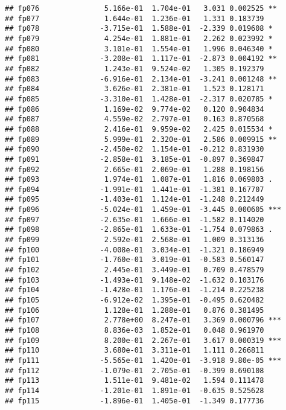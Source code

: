 \documentclass[
]{article}
\begin{document}
\begin{verbatim}
## fp076               5.166e-01  1.704e-01   3.031 0.002525 ** 
## fp077               1.644e-01  1.236e-01   1.331 0.183739    
## fp078              -3.715e-01  1.588e-01  -2.339 0.019608 *  
## fp079               4.254e-01  1.881e-01   2.262 0.023992 *  
## fp080               3.101e-01  1.554e-01   1.996 0.046340 *  
## fp081              -3.208e-01  1.117e-01  -2.873 0.004192 ** 
## fp082               1.243e-01  9.524e-02   1.305 0.192379    
## fp083              -6.916e-01  2.134e-01  -3.241 0.001248 ** 
## fp084               3.626e-01  2.381e-01   1.523 0.128171    
## fp085              -3.310e-01  1.428e-01  -2.317 0.020785 *  
## fp086               1.169e-02  9.774e-02   0.120 0.904834    
## fp087               4.559e-02  2.797e-01   0.163 0.870568    
## fp088               2.416e-01  9.959e-02   2.425 0.015534 *  
## fp089               5.999e-01  2.320e-01   2.586 0.009915 ** 
## fp090              -2.450e-02  1.154e-01  -0.212 0.831930    
## fp091              -2.858e-01  3.185e-01  -0.897 0.369847    
## fp092               2.665e-01  2.069e-01   1.288 0.198156    
## fp093               1.974e-01  1.087e-01   1.816 0.069803 .  
## fp094              -1.991e-01  1.441e-01  -1.381 0.167707    
## fp095              -1.403e-01  1.124e-01  -1.248 0.212449    
## fp096              -5.024e-01  1.459e-01  -3.445 0.000605 ***
## fp097              -2.635e-01  1.666e-01  -1.582 0.114020    
## fp098              -2.865e-01  1.633e-01  -1.754 0.079863 .  
## fp099               2.592e-01  2.568e-01   1.009 0.313136    
## fp100              -4.008e-01  3.034e-01  -1.321 0.186949    
## fp101              -1.760e-01  3.019e-01  -0.583 0.560147    
## fp102               2.445e-01  3.449e-01   0.709 0.478579    
## fp103              -1.493e-01  9.148e-02  -1.632 0.103176    
## fp104              -1.428e-01  1.176e-01  -1.214 0.225238    
## fp105              -6.912e-02  1.395e-01  -0.495 0.620482    
## fp106               1.128e-01  1.288e-01   0.876 0.381495    
## fp107               2.778e+00  8.247e-01   3.369 0.000796 ***
## fp108               8.836e-03  1.852e-01   0.048 0.961970    
## fp109               8.200e-01  2.267e-01   3.617 0.000319 ***
## fp110               3.680e-01  3.311e-01   1.111 0.266811    
## fp111              -5.565e-01  1.420e-01  -3.918 9.80e-05 ***
## fp112              -1.079e-01  2.705e-01  -0.399 0.690108    
## fp113               1.511e-01  9.481e-02   1.594 0.111478    
## fp114              -1.201e-01  1.891e-01  -0.635 0.525628    
## fp115              -1.896e-01  1.405e-01  -1.349 0.177736    

\end{verbatim}
\end{document}
